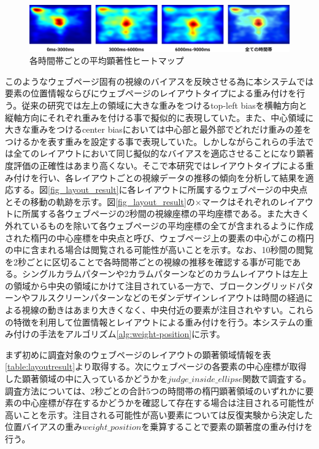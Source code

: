 \begin{figure}[H]
  \centering
  \includegraphics[width=12cm]{figures/06_gazetime.jpg}
  \caption{各時間帯ごとの平均顕著性ヒートマップ}
  \label{fig_gazetime}
\end{figure}

\par このようなウェブページ固有の視線のバイアスを反映させる為に本システムでは要素の位置情報ならびにウェブページのレイアウトタイプによる重み付けを行う。従来の研究では左上の領域に大きな重みをつけるtop-left biasを横軸方向と縦軸方向にそれぞれ重みを付ける事で擬似的に表現していた。また、中心領域に大きな重みをつけるcenter biasにおいては中心部と最外部でどれだけ重みの差をつけるかを表す重みを設定する事で表現していた。しかしながらこれらの手法では全てのレイアウトにおいて同じ擬似的なバイアスを適応させることになり顕著度評価の正確性はあまり高くない。そこで本研究ではレイアウトタイプによる重み付けを行い、各レイアウトごとの視線データの推移の傾向を分析して結果を適応する。図\ref{fig_layout_result}に各レイアウトに所属するウェブページの中央点とその移動の軌跡を示す。図\ref{fig_layout_result}の×マークはそれぞれのレイアウトに所属する各ウェブページの2秒間の視線座標の平均座標である。また大きく外れているものを除いて各ウェブページの平均座標の全てが含まれるように作成された楕円の中心座標を中央点と呼び、ウェブページ上の要素の中心がこの楕円の中に含まれる場合は閲覧される可能性が高いことを示す。なお、10秒間の閲覧を2秒ごとに区切ることで各時間帯ごとの視線の推移を確認する事が可能である。シングルカラムパターンや2カラムパターンなどのカラムレイアウトは左上の領域から中央の領域にかけて注目されている一方で、ブロークングリッドパターンやフルスクリーンパターンなどのモダンデザインレイアウトは時間の経過による視線の動きはあまり大きくなく、中央付近の要素が注目されやすい。これらの特徴を利用して位置情報とレイアウトによる重み付けを行う。本システムの重み付けの手法をアルゴリズム\ref{alg:weight-position}に示す。

\par まず初めに調査対象のウェブページのレイアウトの顕著領域情報を表\ref{table:layoutresult}より取得する。次にウェブページの各要素の中心座標が取得した顕著領域の中に入っているかどうかを$judge\_inside\_ellipse$関数で調査する。調査方法については、2秒ごとの合計5つの時間帯の楕円顕著領域のいずれかに要素の中心座標が存在するかどうかを確認して存在する場合は注目される可能性が高いことを示す。注目される可能性が高い要素については反復実験から決定した位置バイアスの重み$weight\_position$を乗算することで要素の顕著度の重み付けを行う。

